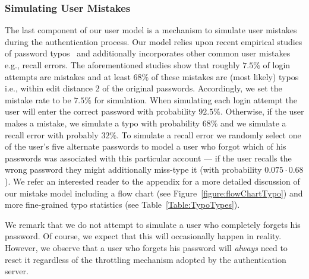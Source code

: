 


\subsubsection{Simulating User Mistakes}\label{section:ExperimentDesign-subsection:SimulateUser-subsubsection:SimulateUserMistake} %
The last component of our user model is a mechanism to simulate user mistakes during the authentication process. Our model relies upon recent empirical studies of password typos~\cite{CCS:CWPCR17,SP:CAAJR16} and additionally incorporates other common user mistakes e.g., recall errors. The aforementioned studies show that roughly $7.5\%$ of login attempts are mistakes and at least $68\%$ of these mistakes are (most likely) typos i.e., within edit distance $2$ of the original passwords.  
Accordingly, we set the mistake rate to be $7.5\%$ for simulation. When simulating each login attempt the user will enter the correct password with probability $92.5\%$. Otherwise, if the user makes a mistake, we simulate a typo with probability $68\%$ and we simulate a recall error with probably $32\%$. To simulate a recall error we randomly select one of the user's five alternate passwords to model a user who forgot which of his passwords was associated with this particular account --- if the user recalls the wrong password they might additionally miss-type it (with probability $0.075\cdot 0.68$).  We refer an interested reader to the appendix for a more detailed discussion of our mistake model including a flow chart (see Figure~\ref{figure:flowChartTypo}) and more fine-grained typo statistics (see  Table~\ref{Table:TypoTypes}).

We remark that we do not attempt to simulate a user who completely forgets his password. Of course, we expect that this will occasionally happen in reality. However, we observe that a user who forgets his password will {\em always} need to reset it regardless of the throttling mechanism adopted by the authentication server. 




